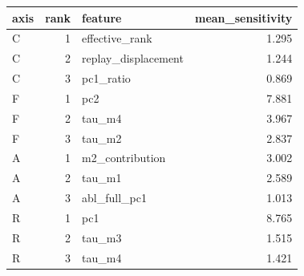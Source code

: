 \begin{tabular}{lrlr}
\toprule
axis & rank & feature & mean_sensitivity \\
\midrule
C & 1 & effective_rank & 1.295 \\
C & 2 & replay_displacement & 1.244 \\
C & 3 & pc1_ratio & 0.869 \\
F & 1 & pc2 & 7.881 \\
F & 2 & tau_m4 & 3.967 \\
F & 3 & tau_m2 & 2.837 \\
A & 1 & m2_contribution & 3.002 \\
A & 2 & tau_m1 & 2.589 \\
A & 3 & abl_full_pc1 & 1.013 \\
R & 1 & pc1 & 8.765 \\
R & 2 & tau_m3 & 1.515 \\
R & 3 & tau_m4 & 1.421 \\
\bottomrule
\end{tabular}
